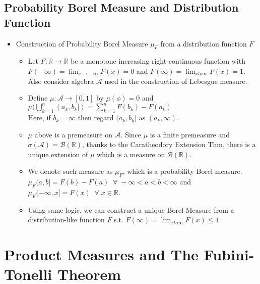 \documentclass[12pt]{article}
\newcommand{\R}{\mathbb{R}}
\newcommand{\A}{\mathcal{A}}
\newcommand{\Borel}{\mathcal{B}(\mathbb{R})}
\newcommand{\forany}{\; \forall \;}
\begin{document}
\subsection{Probability Borel Measure and Distribution Function}
\smallskip
\begin{itemize}
    \item Construction of Probability Borel Measure $\mu_F$ from a distribution function $F$
    \begin{itemize}
        \item Let $F : \R\rightarrow \R$ be a monotone increasing right-continuous function with \\$F(-\infty)=\lim_{x \to -\infty} F(x)=0$ and $F(\infty)=\lim_{x to \infty} F(x)=1$. Also consider algebra $\A$ used in the construction of Lebesgue measure.
        \item Define $\mu : \A \rightarrow [0,1]$ by $\mu(\phi)=0$ and $\mu(\bigcup_{k=1}^n (a_k, b_k])=\sum_{k=1}^n F(b_k)-F(a_k)$ \\ Here, if $b_k=\infty$ then regard $(a_k, b_k]$ as $(a_k, \infty)$.
        \item $\mu$ above is a premeasure on $\A$. Since $\mu$ is a finite premeasure and $\sigma(\A)=\Borel$, thanks to the Caratheodory Extension Thm, there is a unique extension of $\mu$ which is a measure on $\Borel$.
        \item We denote such measure as $\mu_F$, which is a probability Borel measure.\\ $\mu_F(a,b]=F(b)-F(a) \;\forany -\infty<a<b<\infty$ and $\mu_F(-\infty, x]=F(x) \;\forany x\in \R$.
        \item Using same logic, we can construct a unique Borel Measure from a distribution-like function $F$ s.t. $F(\infty)=\lim_{x to \infty} F(x)\leq 1$.
    \end{itemize}
\end{itemize}
\bigskip

\section{Product Measures and The Fubini-Tonelli Theorem}
\smallskip
\end{document}
